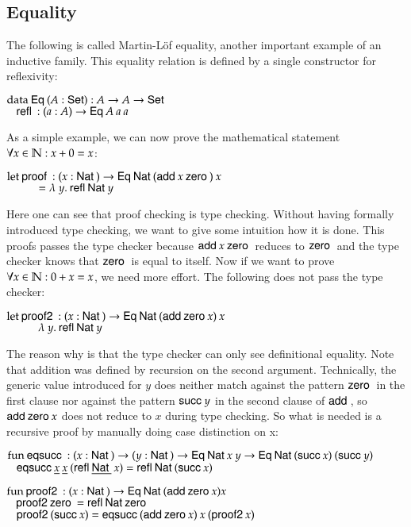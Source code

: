 \subsection{Equality}
The following is called Martin-L\"of equality, another important example of an inductive family.
This equality relation is defined by a single constructor for reflexivity:
\begin{bsp}
$\mathrm{data}\: \mathsf{Eq}\: ( A : \mathsf{Set} ) : A \rightarrow A \rightarrow \mathsf{Set} $ \\
$\hspace*{3mm} \mathsf{refl}\: : ( a : A ) \rightarrow{\mathsf{Eq}\:A \: a \: a}$
\end{bsp}
As a simple example, we can now prove the mathematical statement $ \forall x \in \mathbb{N} : x  + 0 = x $:
\begin{bsp}
$ \mathrm{let}\: \mathsf{proof}\: : ( x : \mathsf{Nat}\: ) \rightarrow{\mathsf{Eq}\:\mathsf{Nat}\:(\mathsf{add}\:x \: \mathsf{zero}\:)\: x} $ \\ 
$ \spcx = \lam{y}\refl \Nat y$ 
\end{bsp}
Here one can see that proof checking is type checking.
Without having formally introduced type checking, we want to give some intuition how it is done.
This proofs passes the type checker because $\mathsf{add}\: x \: \mathsf{zero}\:$ reduces to $\mathsf{zero}\:$ and the type checker knows that $\mathsf{zero}\:$ is equal to itself.
Now if we want to prove $ \forall x \in \mathbb{N} : 0 +  x = x $, we need more effort.
The following does not pass the type checker:
\begin{bsp}
$ \mathrm{let}\: \mathsf{proof2}\: : ( x : \mathsf{Nat}\: ) \rightarrow{\mathsf{Eq}\:\mathsf{Nat}\:(\mathsf{add}\:\mathsf{zero}\:x)\: x} $ \\ 
$ \spcx \lam{y} \refl \Nat y$ 
\end{bsp}
The reason why is that the type checker can only see definitional equality.
Note that addition was defined by recursion on the second argument.
Technically, the generic value introduced for $y$ does neither match against the pattern $\mathsf{zero}\:$ in the first clause
nor against the pattern $\mathsf{succ}\: y$ in the second clause of $\mathsf{add}\:$, so $\mathsf{add}\: \mathsf{zero}\: x$ does not reduce to $x$ during type checking.
So what is needed is a recursive proof by manually doing case distinction on x:
\begin{bsp}
$\mathrm{fun}\: \mathsf{eqsucc}\: : ( x : \mathsf{Nat}\: ) \rightarrow( y : \mathsf{Nat}\: ) \rightarrow \mathsf{Eq}\: \mathsf{Nat}\: x \: y \rightarrow \mathsf{Eq}\: \mathsf{Nat}\: (\mathsf{succ}\: x) \: (\mathsf{succ}\: y)$ \\
$\hspace*{3mm} \mathsf{eqsucc}\: \underline{x} \: \underline{x} \: (\mathsf{refl}\: \underline{\mathsf{Nat}\:} \: x) = \mathsf{refl}\: \mathsf{Nat}\: (\mathsf{succ}\: x)$

$\mathrm{fun}\: \mathsf{proof2}\: : ( x : \mathsf{Nat}\: ) \rightarrow \mathsf{Eq}\: \mathsf{Nat}\: (\mathsf{add}\: \mathsf{zero}\: x) x$\\
$\hspace*{3mm} \mathsf{proof2}\: \mathsf{zero}\: = \mathsf{refl}\: \mathsf{Nat}\: \mathsf{zero}\:$\\
$\hspace*{3mm} \mathsf{proof2}\: (\mathsf{succ}\: x) = \mathsf{eqsucc}\: (\mathsf{add}\: \mathsf{zero}\: x)\: x \: (\mathsf{proof2}\: x)$
\end{bsp}

